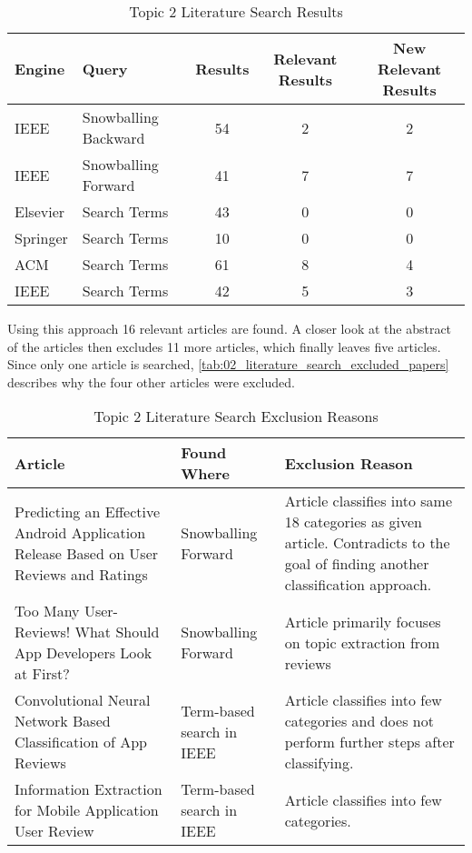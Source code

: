 \begin{table}
    \centering
    \caption{Topic 2 Literature Search Results}
    \begin{tabular}{l|l|c|c|c} \hline
        Engine   & Query          & Results   & Relevant Results  & New Relevant Results \\ \hline\hline
        IEEE            & Snowballing Backward& 54        & 2                 & 2 \\ \hline
        IEEE            & Snowballing Forward & 41        & 7                 & 7 \\ \hline
        Elsevier        & Search Terms        & 43        & 0                 & 0 \\ \hline
        Springer        & Search Terms        & 10        & 0                 & 0 \\ \hline
        ACM             & Search Terms        & 61        & 8                 & 4 \\ \hline
        IEEE            & Search Terms        & 42        & 5                 & 3 \\ \hline
    \end{tabular}
    \label{tab:02_literature_search_results}
\end{table}

Using this approach 16 relevant articles are found. A closer look at the abstract of the articles then excludes 11 more articles, which finally leaves five articles. Since only one article is searched, \autoref{tab:02_literature_search_excluded_papers} describes why the four other articles were excluded.

\begin{table}
    \centering
    \caption{Topic 2 Literature Search Exclusion Reasons}
    \begin{tabular}{p{4cm}|l|p{5cm}} \hline
        Article                                 & Found Where          & Exclusion Reason \\ \hline\hline
        Predicting an Effective Android Application Release Based on User Reviews and Ratings \cite{Mahmud.2019}& Snowballing Forward & Article classifies into same 18 categories as given article. Contradicts to the goal of finding another classification approach. \\ \hline
        Too Many User-Reviews! What Should App Developers Look at First? \cite{Noei.2019}                            & Snowballing Forward      & Article primarily focuses on topic extraction from reviews       \\ \hline
        Convolutional Neural Network Based Classification of App Reviews  \cite{Aslam.2020}                     & Term-based search in IEEE         & Article classifies into few categories and does not perform further steps after classifying.         \\ \hline
        Information Extraction for Mobile Application User Review \cite{Suprayogi.2018}                         & Term-based search in IEEE        & Article classifies into few categories.           \\ \hline
    \end{tabular}
    \label{tab:02_literature_search_excluded_papers}
\end{table}

